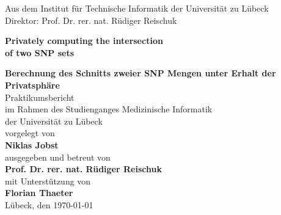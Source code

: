 
\addtolength{\topmargin}{-1.2cm} 
\addtolength{\textwidth}{2.35cm} 

\vspace*{-2.7cm}


\vspace*{0.4cm}
\begin{center}


\enlargethispage{5cm}
Aus dem Institut f\"ur
Technische Informatik
der Universit\"at zu L\"ubeck\\
Direktor: Prof. Dr. rer. nat. Rüdiger Reischuk\\[1.8cm]
%

\begin{large}
\textcolor{Ocean}{{\textbf {Privately computing the intersection } }}\\ %
\textcolor{Ocean}{{\textbf {of two SNP sets} }}\\ %
\end{large}
\vspace*{1.5cm}
%
{{\textbf{Berechnung des Schnitts zweier SNP Mengen unter Erhalt der Privatsphäre} }}\\ %

\vspace*{1.5cm}
%
Praktikumsbericht\\ 
im Rahmen des Studienganges Medizinische Informatik\\
der Universit\"at zu L\"ubeck\\[1.0cm]
%
vorgelegt von\\[0.1cm]
\textbf{Niklas Jobst}\\[1.0cm]
%
ausgegeben und betreut von\\[0.1cm]
\textbf{Prof. Dr. rer. nat. Rüdiger Reischuk}\\[0.3cm]
mit Unterst\"utzung von\\[0.1cm]
\textbf{Florian Thaeter}\\[1.8cm]


L\"ubeck, den \today
\end{center}
  



\newpage
\thispagestyle{empty}

\addtolength{\topmargin}{1.2cm} 
\addtolength{\textwidth}{-2.35cm} 
